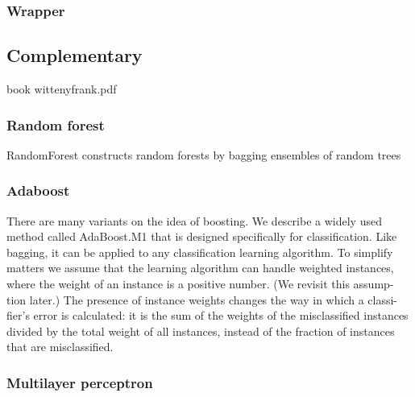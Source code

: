 \documentclass[conference,a4paper]{IEEEtran}
\begin{document}
\subsubsection{Wrapper}

\subsection{Complementary}

book wittenyfrank.pdf

\subsubsection{Random forest}

RandomForest constructs random forests by bagging ensembles of random trees

\subsubsection{Adaboost}

There are many variants on the idea of boosting. We describe a widely used method called AdaBoost.M1 that is designed specifically for classification. Like bagging, it can be applied to any classification learning algorithm. To simplify matters we assume that the learning algorithm can handle weighted instances, where the weight of an instance is a positive number. (We revisit this assump- tion later.) The presence of instance weights changes the way in which a classi- fier’s error is calculated: it is the sum of the weights of the misclassified instances divided by the total weight of all instances, instead of the fraction of instances that are misclassified.

\subsubsection{Multilayer perceptron}
\end{document}
